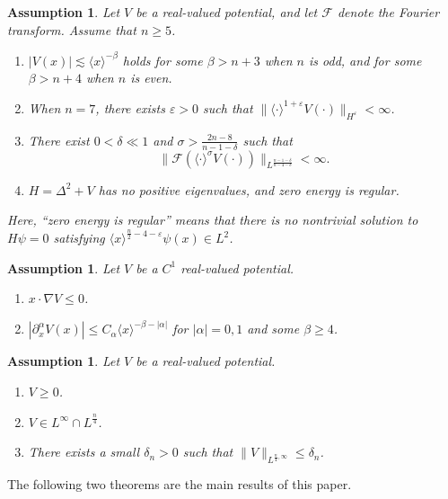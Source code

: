 \documentclass[11pt,a4paper]{article}
\numberwithin{equation}{section}
\newtheorem{assumption}[theorem]{Assumption}
\begin{document}
\begin{assumption}\label{as:wave}
Let $V$ be a real-valued potential, and let $\mathcal{F}$ denote the Fourier transform. Assume that $n \geq 5$.

\begin{enumerate}
  \item $|V(x)| \lesssim \langle x \rangle^{-\beta}$ holds for some $\beta > n + 3$ when $n$ is odd, and for some $\beta > n + 4$ when $n$ is even.
  \item When $n = 7$, there exists $\varepsilon > 0$ such that $\|\langle \cdot \rangle^{1 + \varepsilon} V(\cdot)\|_{H^{\varepsilon}} < \infty$.
  \item There exist $0 < \delta \ll 1$ and $\sigma > \frac{2n - 8}{n - 1 - \delta}$ such that
  \[
  \|\mathcal{F}(\langle \cdot \rangle^{\sigma}V(\cdot))\|_{L^{\frac{n - 1 - \delta}{n - 4 - \delta}}} < \infty.
  \]
  \item $H = \Delta^{2} + V$ has no positive eigenvalues, and zero energy is regular.
\end{enumerate}
Here, ``zero energy is regular'' means that there is no nontrivial solution to $H\psi = 0$ satisfying $\langle x \rangle^{\frac{n}{2} - 4 - \varepsilon}\psi(x) \in L^{2}$.
\end{assumption}

\begin{assumption}\label{as:mora}
Let $V$ be a $C^{1}$ real-valued potential.
\begin{enumerate}
\item $x \cdot \nabla V \leq 0$.
\item $|\partial^{\alpha}_{x}V(x)| \leq C_{\alpha}\langle x \rangle^{-\beta-|\alpha|}$ for $|\alpha| = 0 , 1$ and some $\beta \geq 4$.
\end{enumerate}
\end{assumption}

\begin{assumption}\label{as:equ}
Let $V$ be a real-valued potential.
\begin{enumerate}
\item $V \geq 0$.
\item $V \in L^{\infty} \cap L^{\frac{n}{4}}$.
\item There exists a small $\delta_{n} > 0$ such that $\|V\|_{L^{\frac{n}{4},\infty}} \leq \delta_{n}$.
\end{enumerate}
\end{assumption}

The following two theorems are the main results of this paper.
\end{document}
